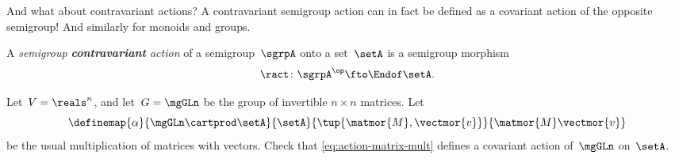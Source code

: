 And what about contravariant actions? A contravariant semigroup action can in fact be defined as a covariant action of the opposite semigroup! And similarly for monoids and groups.

\begin{ctdefinition}
    \label{def:semigroup-cont-action}
    A \emph{semigroup \textbf{contravariant} action} of a semigroup~$\sgrpA$ onto a set~$\setA$ is a semigroup morphism
    \begin{equation}
        \ract \colon \sgrpA^{\op} \fto \Endof\setA.
    \end{equation}
\end{ctdefinition}


\begin{gradedexercise}
    \label{ex:MatrixMultAction}
    Let~$V = \reals^n$, and let~$G = \mgGLn$ be the group of invertible $n \times n$ matrices.
    Let
    \begin{equation}
        \label{eq:action-matrix-mult}
        \definemap{
            \alpha
        }{
            \mgGLn \cartprod \setA
        }{
            \setA
        }{
            \tup{\matmor{M}, \vectmor{v}}
        }{
            \matmor{M}\vectmor{v}
        }
    \end{equation}
    be the usual multiplication of matrices with vectors.
    Check that \cref{eq:action-matrix-mult} defines a covariant action of~$\mgGLn$ on~$\setA$.
\end{gradedexercise}

